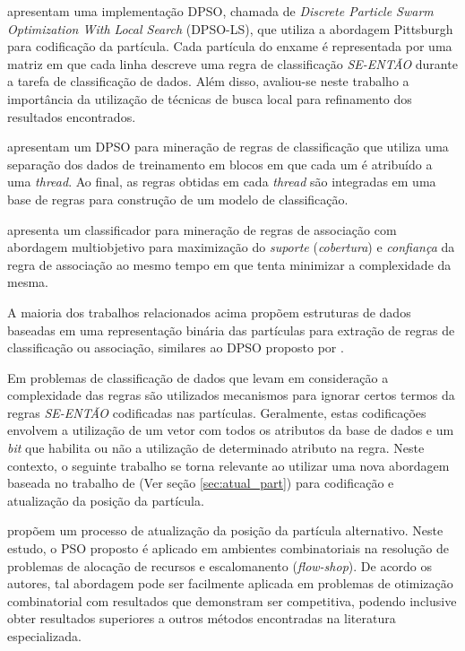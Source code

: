 \documentclass[
	12pt,				%
	openany,			%
	oneside,	
	a4paper,			%
	brazil,				%
	]{unimontes-ppgmsc-abntex2}
\begin{document}
 apresentam uma implementação DPSO, chamada de {\em Discrete Particle Swarm Optimization With Local Search} (DPSO-LS), que utiliza a abordagem Pittsburgh para codificação da partícula. Cada partícula do enxame é representada por uma matriz em que cada linha descreve uma regra de classificação {\em SE-ENTÃO} durante a tarefa de classificação de dados. Além disso, avaliou-se neste trabalho a importância da utilização de técnicas de busca local para refinamento dos resultados encontrados.

 apresentam um DPSO para mineração de regras de classificação que utiliza uma separação dos dados de treinamento em blocos em que cada um é atribuído a uma {\em thread}. Ao final, as regras obtidas em cada {\em thread} são integradas em uma base de regras para construção de um modelo de classificação.

 apresenta um classificador para mineração de regras de associação com abordagem multiobjetivo para maximização do {\em suporte} ({\em cobertura}) e {\em confiança} da regra de associação ao mesmo tempo em que tenta minimizar a complexidade da mesma.

A maioria dos trabalhos relacionados acima propõem estruturas de dados baseadas em uma representação binária das partículas para extração de regras de classificação ou associação, similares ao DPSO proposto por . 

Em problemas de classificação de dados que levam em consideração a complexidade das regras são utilizados mecanismos para ignorar certos termos da regras {\em SE-ENTÃO} codificadas nas partículas. Geralmente, estas codificações envolvem a utilização de um vetor com todos os atributos da base de dados e um {\em bit} que habilita ou não a utilização de determinado atributo na regra. Neste contexto, o seguinte trabalho se torna relevante ao utilizar uma nova abordagem baseada no trabalho de  (Ver seção \ref{sec:atual_part}) para codificação e atualização da posição da partícula.

 propõem um processo de atualização da posição da partícula alternativo. Neste estudo, o PSO proposto é aplicado em ambientes combinatoriais na resolução de problemas de alocação de recursos e escalomanento ({\em flow-shop}). De acordo os autores, tal abordagem pode ser facilmente aplicada em problemas de otimização combinatorial com resultados que demonstram ser competitiva, podendo inclusive obter resultados superiores a outros métodos encontradas na literatura especializada.
\end{document}
